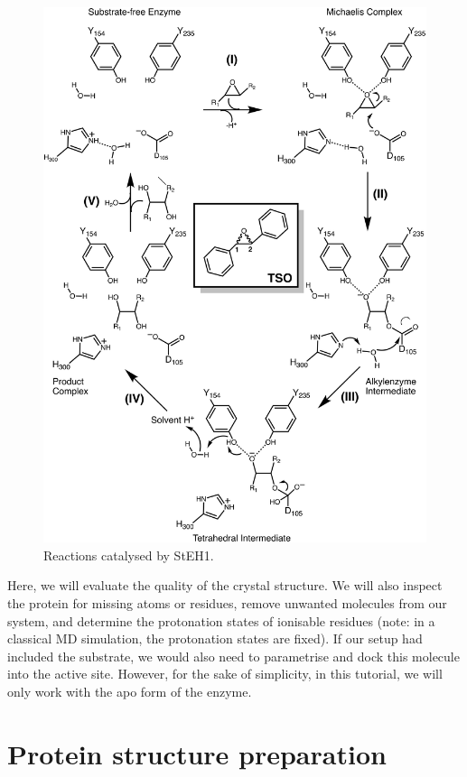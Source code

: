 \documentclass[10pt]{article}
\begin{document}
\begin{figure}[H]
 \centering
 \includegraphics[scale=0.3]{./img/rxns}
 \caption{Reactions catalysed by StEH1.}
\end{figure}

Here, we will evaluate the quality of the crystal structure. We will also inspect the protein for missing atoms or residues, remove unwanted molecules from our system, and determine the protonation states of ionisable residues (note: in a classical MD simulation, the protonation states are fixed). If our setup had included the substrate, we would also need to parametrise and dock this molecule into the active site. However, for the sake of simplicity, in this tutorial, we will only work with the apo form of the enzyme. 

\section{Protein structure preparation}
\end{document}
